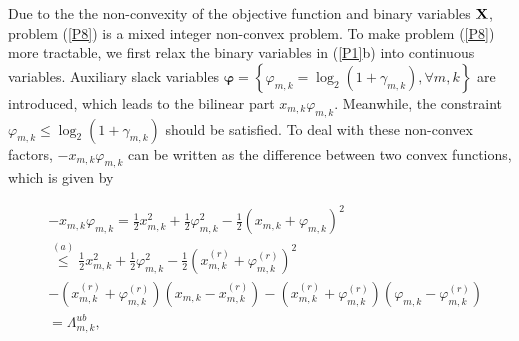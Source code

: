 \documentclass[journal]{IEEEtran}
\begin{document}
\noindent Due to the the non-convexity of the objective function and binary variables $ \bf{X} $, problem (\ref{P8}) is a mixed integer non-convex problem. To make problem (\ref{P8}) more tractable, we first relax the binary variables in (\ref{P1}b) into continuous variables. Auxiliary slack variables $ \bm{\varphi}  = \left\{ {{\varphi _{m,k}} = {{\log }_2}\left( {1 + {\gamma _{m,k}}} \right),\forall m,k} \right\} $ are introduced, which leads to the bilinear part $ {{x_{m,k}}{\varphi _{m,k}}} $. Meanwhile, the constraint $ {\varphi _{m,k}} \le {\log _2}\left( {1 + {\gamma _{m,k}}} \right) $ should be satisfied. To deal with these non-convex factors, $ - {x_{m,k}}{\varphi _{m,k}}$ can be written as the difference between two convex functions, which is given by
\begin{small}
\setlength\abovedisplayskip{2pt}
\setlength\belowdisplayskip{3pt}
	\begin{subequations}
		\begin{align}
		&- {x_{m,k}}{\varphi _{m,k}} = \frac{1}{2}x_{m,k}^2 + \frac{1}{2}\varphi _{m,k}^2 - \frac{1}{2}{\left( {{x_{m,k}} + {\varphi _{m,k}}} \right)^2}\nonumber\\
		&\mathop  \le \limits^{\left( a \right)} \frac{1}{2}x_{m,k}^2 + \frac{1}{2}\varphi _{m,k}^2 - \frac{1}{2}{\left( {x_{m,k}^{\left( r \right)} + \varphi _{m,k}^{\left( r \right)}} \right)^2}\nonumber\\
		&- \left( {x_{m,k}^{\left( r \right)} + \varphi _{m,k}^{\left( r \right)}} \right)\left( {{x_{m,k}} - x_{m,k}^{\left( r \right)}} \right) - \left( {x_{m,k}^{\left( r \right)} + \varphi _{m,k}^{\left( r \right)}} \right)\left( {{\varphi _{m,k}} - \varphi _{m,k}^{\left( r \right)}} \right)\nonumber\\
		&= \Lambda _{m,k}^{ub},
		\end{align}
	\end{subequations}
\end{small}
\end{document}
